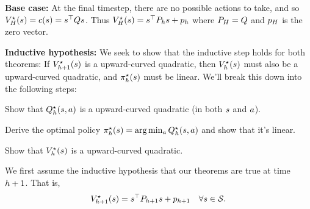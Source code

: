\documentclass[\main/main]{subfiles}
\begin{document}



\textbf{Base case:} At the final timestep, there are no possible actions to take, and so $V^\star_H(s) = c(s) = s^\top Q s$. Thus $V_H^\star(s) = s^\top P_h s + p_h$ where $P_H = Q$ and $p_H$ is the zero vector.

\textbf{Inductive hypothesis:} We seek to show that the inductive step holds for both theorems: If $V^\star_{h+1}(s)$ is a upward-curved quadratic, then $V^\star_h(s)$ must also be a upward-curved quadratic, and $\pi^\star_h(s)$ must be linear. We'll break this down into the following steps:
\begin{steps}
    \item Show that $Q^\star_h(s, a)$ is a upward-curved quadratic (in both $s$ and $a$).
    \item Derive the optimal policy $\pi^\star_h(s) = \arg \min_a Q^\star_h(s, a)$ and show that it's linear.
    \item Show that $V^\star_h(s)$ is a upward-curved quadratic.
\end{steps}

We first assume the inductive hypothesis that our theorems are true at time $h+1$. That is,
\[ V^\star_{h+1}(s) = s^\top P_{h+1} s + p_{h+1} \quad \forall s \in \mathcal{S}. \]
\end{document}

